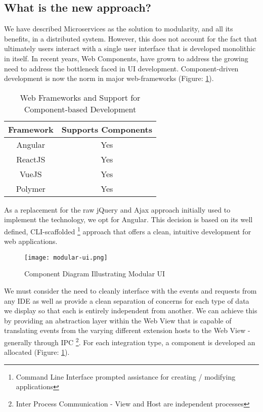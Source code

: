 \subsection{What is the new approach?}

We have described Microservices as the solution to modularity, and all its benefits, in a distributed system. However, this does not account for the fact that ultimately users interact with a single user interface that is developed monolithic in itself. In recent years, Web Components, have grown to address the growing need to address the bottleneck faced in UI development. Component-driven development is now the norm in major web-frameworks (Figure: \ref{table:webFrameworkComponentSupport}).

\begin{table}[h!]
	\centering
	\begin{tabular}{|c|c|}
		\hline 
		Framework & Supports Components \\ 
		\hline 
		\hline 
		Angular & Yes \\ 
		\hline
		ReactJS & Yes \\ 
		\hline 
		VueJS & Yes \\ 
		\hline
		Polymer & Yes \\ 
		\hline  
	\end{tabular} 
	\caption{Web Frameworks and Support for Component-based Development}
	\label{table:webFrameworkComponentSupport}
\end{table}

As a replacement for the raw jQuery and Ajax approach initially used to implement the technology, we opt for Angular. This decision is based on its well defined, CLI-scaffolded \footnote{Command Line Interface prompted assistance for creating / modifying applications} approach that offers a clean, intuitive development for web applications.

\begin{figure}[h!]
	\centering
	\texttt{[image: modular-ui.png]}
	\caption{Component Diagram Illustrating Modular UI}
	\label{fig:modularUIComponentDiagram}
\end{figure}


We must consider the need to cleanly interface with the events and requests from  any IDE as well as provide a clean separation of concerns for each type of data we display so that each is entirely independent from another. We can achieve this by providing an abstraction layer within the Web View that is capable of translating events from the varying different extension hosts to the Web View - generally through IPC \footnote{Inter Process Communication - View and Host are independent processes}. For each integration type, a component is developed an allocated (Figure: \ref{fig:modularUIComponentDiagram}). 


